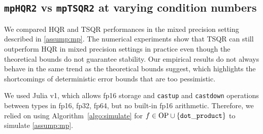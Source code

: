 \subsection{{\tt mpHQR2} vs {\tt mpTSQR2} at varying condition numbers}
We compared HQR and TSQR performances in the mixed precision setting described in \cref{assump:mp}.
The numerical experiments show that TSQR can still outperform HQR in mixed precision settings in practice even though the theoretical bounds do not guarantee stability.
Our empirical results do not always behave in the same trend as the theoretical bounds suggest, which highlights the shortcomings of deterministic error bounds that are too pessimistic. \par
We used Julia v1, which allows fp16 storage and {\tt castup} and {\tt castdown} operations between types in {fp16, fp32, fp64}, but no built-in fp16 arithmetic.
Therefore, we relied on using Algorithm~\ref{algo:simulate} for $f\in \text{OP} \cup\{{\tt dot\_product}\}$ to simulate \cref{assump:mp}.
